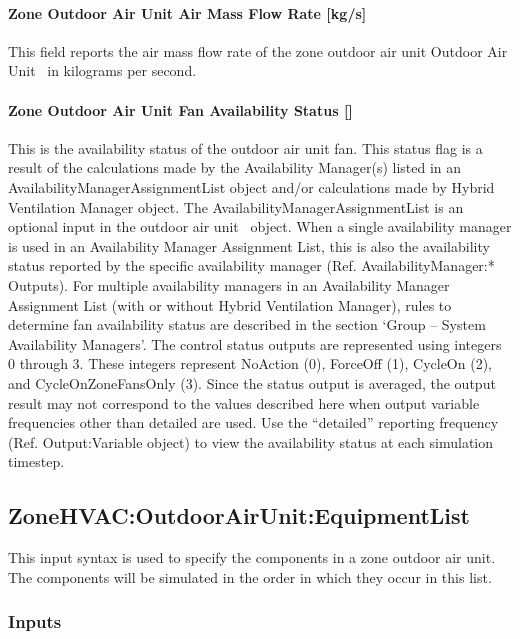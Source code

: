\paragraph{Zone Outdoor Air Unit Air Mass Flow Rate {[}kg/s{]}}\label{zone-outdoor-air-unit-air-mass-flow-rate-kgs}

This field reports the air mass flow rate of the zone outdoor air unit Outdoor Air Unit~ in kilograms per second.

\paragraph{Zone Outdoor Air Unit Fan Availability Status {[]}}\label{zone-outdoor-air-unit-fan-availability-status}

This is the availability status of the outdoor air unit fan. This status flag is a result of the calculations made by the Availability Manager(s) listed in an AvailabilityManagerAssignmentList object and/or calculations made by Hybrid Ventilation Manager object. The AvailabilityManagerAssignmentList is an optional input in the outdoor air unit~ object. When a single availability manager is used in an Availability Manager Assignment List, this is also the availability status reported by the specific availability manager (Ref. AvailabilityManager:* Outputs). For multiple availability managers in an Availability Manager Assignment List (with or without Hybrid Ventilation Manager), rules to determine fan availability status are described in the section `Group -- System Availability Managers'. The control status outputs are represented using integers 0 through 3. These integers represent NoAction (0), ForceOff (1), CycleOn (2), and CycleOnZoneFansOnly (3). Since the status output is averaged, the output result may not correspond to the values described here when output variable frequencies other than detailed are used. Use the ``detailed'' reporting frequency (Ref. Output:Variable object) to view the availability status at each simulation timestep.

\subsection{ZoneHVAC:OutdoorAirUnit:EquipmentList}\label{zonehvacoutdoorairunitequipmentlist}

This input syntax is used to specify the components in a zone outdoor air unit. The components will be simulated in the order in which they occur in this list.

\subsubsection{Inputs}\label{inputs-6-032}

